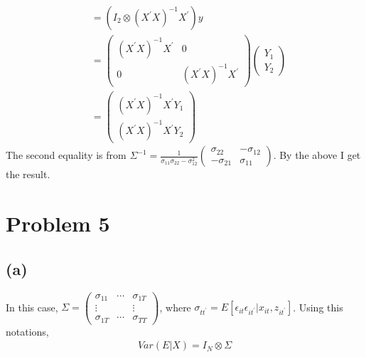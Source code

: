 \documentclass{article}
\begin{document}
\begin{align*}
	&= \left( I_2 \otimes (X^{'}X)^{-1}X^{'} \right) y\\[8pt]
	&= \left( \begin{array}{cc} (X^{'}X)^{-1}X^{'} & 0 \\ 0 & (X^{'}X)^{-1}X^{'} \end{array} \right) \left( \begin{array}{cc} Y_1\\Y_2 \end{array}\right)\\[8pt]
	&= \left( \begin{array}{cc} (X^{'}X)^{-1}X^{'}Y_1 \\ (X^{'}X)^{-1}X^{'}Y_2 \end{array}\right)
\end{align*}
The second equality is from $\Sigma^{-1} = \frac{1}{\sigma_{11}\sigma_{22} - \sigma_{12}^2}\left( \begin{array}{cc} \sigma_{22} & -\sigma_{12} \\ -\sigma_{21} & \sigma_{11} \end{array} \right)$. By the above I get the result.


\section{Problem 5}
\subsection{(a)}
In this case, $\Sigma = \left( \begin{array}{ccc} \sigma_{11}&\cdots&\sigma_{1T}\\ \vdots&&\vdots\\ \sigma_{1T}&\cdots&\sigma_{TT} \end{array} \right)$, where $\sigma_{tt^{'}} = E[\epsilon_{it} \epsilon_{it^{'}} | x_{it}, z_{it^{'}}]$. Using this notations,
\begin{align*}
	Var(E | X) = I_N \otimes \Sigma
\end{align*}
\end{document}
